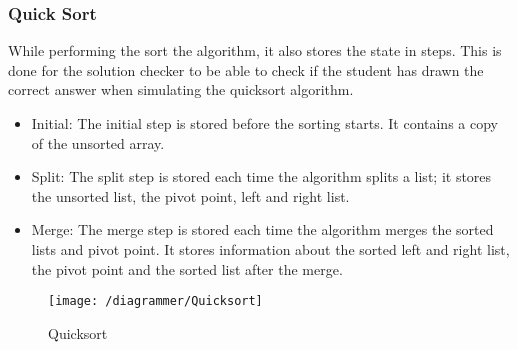 \subsubsection{Quick Sort}
While performing the sort the algorithm, it also stores the state in steps. This is done for the solution checker to be able to check if the student has drawn the correct answer when simulating the quicksort algorithm.
\begin{itemize}
    \item Initial: The initial step is stored before the sorting starts. It contains a copy of the unsorted array.
    \item Split: The split step is stored each time the algorithm splits a list; it stores the unsorted list, the pivot point, left and right list.
    \item Merge: The merge step is stored each time the algorithm merges the sorted lists and pivot point. It stores information about the sorted left and right list, the pivot point and the sorted list after the merge.
\end{itemize}
\begin{figure}[H]
    \texttt{[image: /diagrammer/Quicksort]}
    \caption{Quicksort}
    \label{fig:quicksort}
\end{figure}